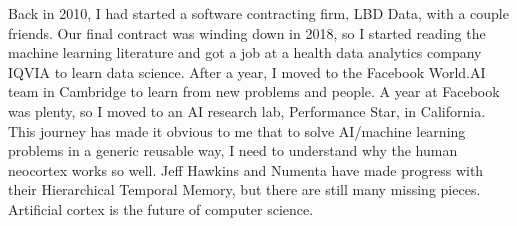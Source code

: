 \documentclass{article}
\begin{document}
Back in 2010, I had started a software contracting firm, LBD Data,
with a couple friends. Our final contract was winding down in 2018, so
I started reading the machine learning literature and got a job at a health data analytics company IQVIA to learn data science.  
After a year, I moved to the Facebook World.AI team in Cambridge to learn from new problems and people. 
A year at Facebook was plenty, so I moved to an AI research lab, Performance Star, in California. 
This journey has made it obvious to me that to solve AI/machine learning problems in a generic reusable way, I need to understand why the human neocortex works so well. 
Jeff Hawkins and Numenta have made progress with their Hierarchical Temporal Memory, but there are still many missing pieces.  Artificial cortex is the
future of computer science.
\end{document}
